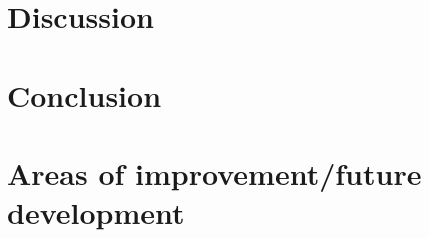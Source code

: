\documentclass[../master_thesis.tex]{subfiles}
\begin{document}
\section{Discussion}
\section{Conclusion}
\section{Areas of improvement/future development}





\biblio
\end{document}

